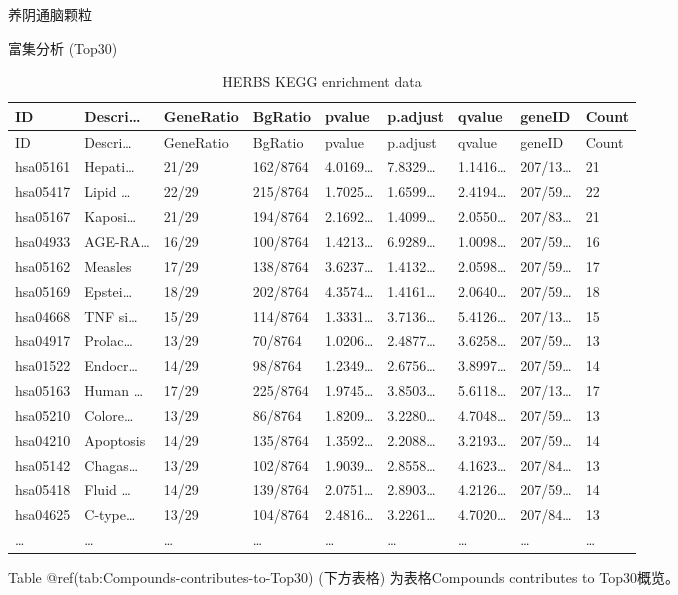 \documentclass[
  ignorenonframetext,
]{beamer}
\begin{document}
\begin{frame}[fragile]{养阴通脑颗粒}
\begin{block}{富集分析 (Top30)}
\begin{longtable}[]{@{}lllllllll@{}}
\caption{HERBS KEGG enrichment data}\tabularnewline
\toprule
ID & Descri\ldots{} & GeneRatio & BgRatio & pvalue & p.adjust & qvalue &
geneID & Count\tabularnewline
\midrule
\endfirsthead
\toprule
ID & Descri\ldots{} & GeneRatio & BgRatio & pvalue & p.adjust & qvalue &
geneID & Count\tabularnewline
\midrule
\endhead
hsa05161 & Hepati\ldots{} & 21/29 & 162/8764 & 4.0169\ldots{} &
7.8329\ldots{} & 1.1416\ldots{} & 207/13\ldots{} & 21\tabularnewline
hsa05417 & Lipid \ldots{} & 22/29 & 215/8764 & 1.7025\ldots{} &
1.6599\ldots{} & 2.4194\ldots{} & 207/59\ldots{} & 22\tabularnewline
hsa05167 & Kaposi\ldots{} & 21/29 & 194/8764 & 2.1692\ldots{} &
1.4099\ldots{} & 2.0550\ldots{} & 207/83\ldots{} & 21\tabularnewline
hsa04933 & AGE-RA\ldots{} & 16/29 & 100/8764 & 1.4213\ldots{} &
6.9289\ldots{} & 1.0098\ldots{} & 207/59\ldots{} & 16\tabularnewline
hsa05162 & Measles & 17/29 & 138/8764 & 3.6237\ldots{} & 1.4132\ldots{}
& 2.0598\ldots{} & 207/59\ldots{} & 17\tabularnewline
hsa05169 & Epstei\ldots{} & 18/29 & 202/8764 & 4.3574\ldots{} &
1.4161\ldots{} & 2.0640\ldots{} & 207/59\ldots{} & 18\tabularnewline
hsa04668 & TNF si\ldots{} & 15/29 & 114/8764 & 1.3331\ldots{} &
3.7136\ldots{} & 5.4126\ldots{} & 207/13\ldots{} & 15\tabularnewline
hsa04917 & Prolac\ldots{} & 13/29 & 70/8764 & 1.0206\ldots{} &
2.4877\ldots{} & 3.6258\ldots{} & 207/59\ldots{} & 13\tabularnewline
hsa01522 & Endocr\ldots{} & 14/29 & 98/8764 & 1.2349\ldots{} &
2.6756\ldots{} & 3.8997\ldots{} & 207/59\ldots{} & 14\tabularnewline
hsa05163 & Human \ldots{} & 17/29 & 225/8764 & 1.9745\ldots{} &
3.8503\ldots{} & 5.6118\ldots{} & 207/13\ldots{} & 17\tabularnewline
hsa05210 & Colore\ldots{} & 13/29 & 86/8764 & 1.8209\ldots{} &
3.2280\ldots{} & 4.7048\ldots{} & 207/59\ldots{} & 13\tabularnewline
hsa04210 & Apoptosis & 14/29 & 135/8764 & 1.3592\ldots{} &
2.2088\ldots{} & 3.2193\ldots{} & 207/59\ldots{} & 14\tabularnewline
hsa05142 & Chagas\ldots{} & 13/29 & 102/8764 & 1.9039\ldots{} &
2.8558\ldots{} & 4.1623\ldots{} & 207/84\ldots{} & 13\tabularnewline
hsa05418 & Fluid \ldots{} & 14/29 & 139/8764 & 2.0751\ldots{} &
2.8903\ldots{} & 4.2126\ldots{} & 207/59\ldots{} & 14\tabularnewline
hsa04625 & C-type\ldots{} & 13/29 & 104/8764 & 2.4816\ldots{} &
3.2261\ldots{} & 4.7020\ldots{} & 207/84\ldots{} & 13\tabularnewline
\ldots{} & \ldots{} & \ldots{} & \ldots{} & \ldots{} & \ldots{} &
\ldots{} & \ldots{} & \ldots{}\tabularnewline
\bottomrule
\end{longtable}

Table @ref(tab:Compounds-contributes-to-Top30) (下方表格)
为表格Compounds contributes to Top30概览。


\end{block}
\end{frame}
\end{document}
